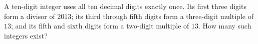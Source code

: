 A ten-digit integer uses all ten decimal digits exactly once. Its first three digits form a divisor of $2013$; its third through fifth digits form a three-digit multiple of $13$; and its fifth and sixth digits form a two-digit multiple of $13$. How many such integers exist?
